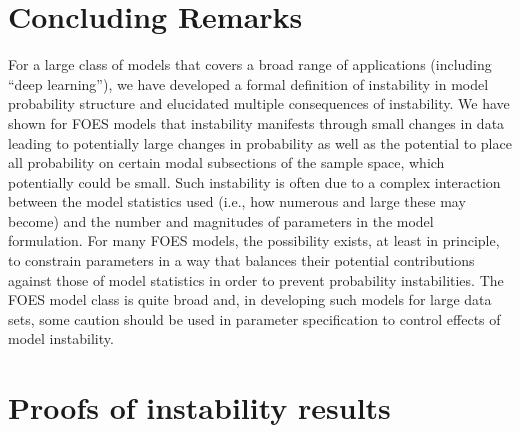 \documentclass[numbib]{imamat}
\theoremstyle{theorem}
\theoremstyle{lemma}
\theoremstyle{example}
\theoremstyle{corollary}
\theoremstyle{definition}
\theoremstyle{remark}
\theoremstyle{approximation}
\theoremstyle{scheme}
\newcommand{\ak}[1]{{\color{blue} #1}}
\begin{document}
\hypertarget{conclusions}{%
\section{Concluding Remarks}\label{conclusions}}

For a large class of models that covers a broad range of applications (including ``deep learning''), we have developed a formal definition of instability in model probability structure and elucidated multiple consequences of instability. We have shown for FOES models that instability manifests through small changes in data leading to potentially large changes in probability as well as the potential to place all probability on certain modal subsections of the sample space, which potentially could be small. Such instability is often due to a complex interaction between the model statistics used (i.e., how numerous and large these may become) and the number and magnitudes of
parameters in the model formulation. For many FOES models, the possibility exists, at least in principle, to \ak{constrain} parameters in a way \ak{that} balances their potential contributions against those of model statistics in order to prevent probability instabilities. The FOES model class is quite broad and, in developing such models for large data sets, some caution should be used in parameter specification to control effects of model instability.

\clearpage

\hypertarget{appendix-appendix}{%
\appendix}


\hypertarget{appendix-instab}{%
\section{Proofs of instability results}\label{appendix-instab}}
\end{document}
